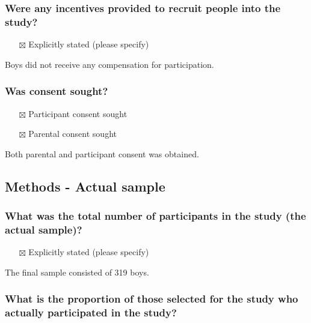 \documentclass[
  doc, a4paper]{apa7}
\providecommand{\tightlist}{%
  \setlength{\itemsep}{0pt}\setlength{\parskip}{0pt}}
\begin{document}
\subsubsection{Were any incentives provided to recruit people into the study?}\label{were-any-incentives-provided-to-recruit-people-into-the-study}

\begin{itemize}
\tightlist
\item[$\boxtimes$]
  Explicitly stated (please specify)
\end{itemize}

Boys did not receive any compensation for participation.

\subsubsection{Was consent sought?}\label{was-consent-sought}

\begin{itemize}
\tightlist
\item[$\boxtimes$]
  Participant consent sought
\item[$\boxtimes$]
  Parental consent sought
\end{itemize}

Both parental and participant consent was obtained.

\subsection{Methods - Actual sample}\label{methods---actual-sample}

\subsubsection{What was the total number of participants in the study (the actual sample)?}\label{what-was-the-total-number-of-participants-in-the-study-the-actual-sample}

\begin{itemize}
\tightlist
\item[$\boxtimes$]
  Explicitly stated (please specify)
\end{itemize}

The final sample consisted of 319 boys.

\subsubsection{What is the proportion of those selected for the study who actually participated in the study?}\label{what-is-the-proportion-of-those-selected-for-the-study-who-actually-participated-in-the-study}
\end{document}
